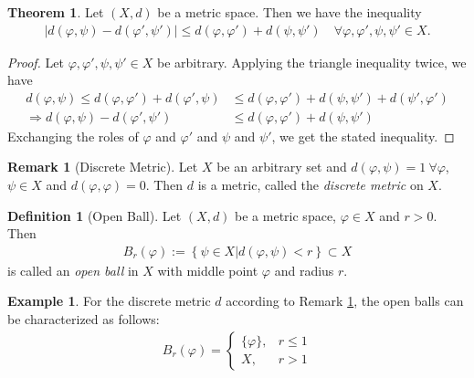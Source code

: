 \documentclass[12pt, a4paper]{article}
\numberwithin{equation}{section}
\theoremstyle{definition}
\theoremstyle{definition}
\newtheorem{defn}[thm]{Definition} %
\newtheorem{exmp}[thm]{Example} %
\newtheorem{remark}[thm]{Remark} %
\newtheorem{theorem}[thm]{Theorem}
\newcommand{\abs}[1]{\left\vert #1 \right\vert}
\begin{document}
	\begin{theorem}\label{thrm:vierecksungleichung}
		Let $(X, d)$ be a metric space. Then we have the inequality
		\begin{align}
			\abs{d(\varphi, \psi) - d(\varphi', \psi')} \leq d(\varphi, \varphi') + d(\psi, \psi') \quad \forall \varphi, \varphi', \psi, \psi'\in X.
		\end{align}
	\end{theorem}

	\begin{proof}
		Let $\varphi, \varphi', \psi, \psi'\in X$ be arbitrary. Applying the triangle inequality twice, we have
		\begin{align}
			d(\varphi, \psi) \leq d(\varphi, \varphi') + d(\varphi', \psi) &\leq d(\varphi, \varphi') + d(\psi, \psi') + d(\psi', \varphi')
			\\ \Rightarrow d(\varphi, \psi) - d(\varphi', \psi') &\leq d(\varphi, \varphi') + d(\psi, \psi')
		\end{align}
		Exchanging the roles of $\varphi$ and $\varphi'$ and $\psi$ and $\psi'$, we get the stated inequality.
	\end{proof}
	
	\begin{remark}[Discrete Metric]\label{remark:discrete-metric}
		Let $X$ be an arbitrary set and $d(\varphi, \psi) = 1 \ \forall \varphi$, $\psi\in X$ and $d(\varphi, \varphi) = 0$. Then $d$ is a metric, called the \textit{discrete metric} on $X$. 
	\end{remark}
	
	\begin{defn}[Open Ball]
		Let $(X, d)$ be a metric space, $\varphi\in X$ and $r > 0$. Then 
		\begin{align}
			B_{r}(\varphi) := \left\{ \psi\in X \vert d(\varphi, \psi) < r\right\} \subset X
		\end{align}
		is called an \textit{open ball} in $X$ with middle point $\varphi$ and radius $r$. 
 	\end{defn}
 
 	\begin{exmp}\label{exmp:open-balls-discrete-metric}
 		For the discrete metric $d$ according to Remark \ref{remark:discrete-metric}, the open balls can be characterized as follows:
 		\begin{align}
 			B_{r}(\varphi) = \begin{cases}
 				\{\varphi\}, &r \leq 1 
 				\\ X, &r > 1
 			\end{cases}
 		\end{align}
 	\end{exmp} 
	
\end{document}
